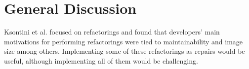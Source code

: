 \section{General Discussion} \label{sec:general_discussion}

Ksontini et al. \cite{ksontiniRefactoringsTechnicalDebt} focused on refactorings and found that developers' main motivations for performing refactorings were tied to maintainability and image size among others. Implementing some of these refactorings as repairs would be useful, although implementing all of them would be challenging.

